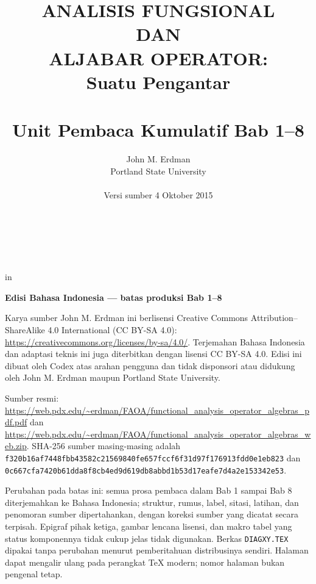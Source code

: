 \documentclass[11pt,reqno]{amsbook}
\theoremstyle{definition}
\theoremstyle{remark}
\numberwithin{equation}{section}
\begin{document}
 \frontmatter
 \title{ANALISIS FUNGSIONAL \\ DAN \\ ALJABAR OPERATOR: \\ Suatu Pengantar \\ \mbox{} \\ \large Unit Pembaca Kumulatif Bab 1--8}
 \author{John M. Erdman \\
      Portland State University \\
      \mbox{\hphantom{P}} \\
      Versi sumber 4 Oktober 2015 \\
      \mbox{\hphantom{P}} \\
      \mbox{\hphantom{P}} \\
            \mbox{\hphantom{P}} \\
                  \mbox{\hphantom{P}} }


 in


\maketitle


\begin{center}
\textbf{Edisi Bahasa Indonesia --- batas produksi Bab 1--8}
\end{center}

Karya sumber John M. Erdman ini berlisensi Creative Commons
Attribution--ShareAlike 4.0 International (CC BY-SA 4.0):
\url{https://creativecommons.org/licenses/by-sa/4.0/}.
Terjemahan Bahasa Indonesia dan adaptasi teknis ini juga diterbitkan dengan
lisensi CC BY-SA 4.0. Edisi ini dibuat oleh Codex atas arahan pengguna dan tidak
disponsori atau didukung oleh John M. Erdman maupun Portland State University.

\begin{sloppypar}
Sumber resmi:
\url{https://web.pdx.edu/~erdman/FAOA/functional_analysis_operator_algebras_pdf.pdf}
dan
\url{https://web.pdx.edu/~erdman/FAOA/functional_analysis_operator_algebras_web.zip}.
SHA-256 sumber masing-masing adalah
\texttt{f320b16af7448fbb43582c21569840fe\allowbreak657fccf6f31d97f176913fdd0e1eb823}
dan
\texttt{0c667cfa7420b61dda8f8cb4ed9d619d\allowbreak b8abbd1b53d17eafe7d4a2e153342e53}.
\end{sloppypar}

Perubahan pada batas ini: semua prosa pembaca dalam Bab 1 sampai Bab 8
diterjemahkan ke Bahasa Indonesia; struktur, rumus, label, sitasi, latihan,
dan penomoran sumber dipertahankan, dengan koreksi sumber yang dicatat secara
terpisah. Epigraf pihak ketiga, gambar lencana lisensi, dan makro tabel yang
status komponennya tidak cukup jelas tidak digunakan. Berkas
\texttt{DIAGXY.TEX} dipakai tanpa perubahan menurut pemberitahuan distribusinya
sendiri. Halaman dapat
mengalir ulang pada perangkat TeX modern; nomor halaman bukan pengenal tetap.
\end{document}
